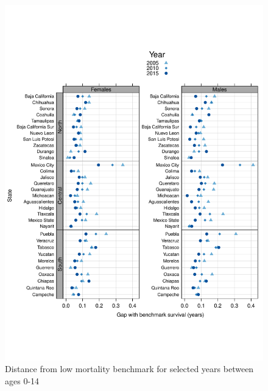 \documentclass[11.5pt]{article}
\begin{document}
{\begin{figure}
\centering
\caption{Distance from low mortality benchmark for selected years between ages 0-14}
\begin{center}
\includegraphics[scale=.5]{Distance_y.pdf}
\end{center}
\end{figure}


}
\end{document}
